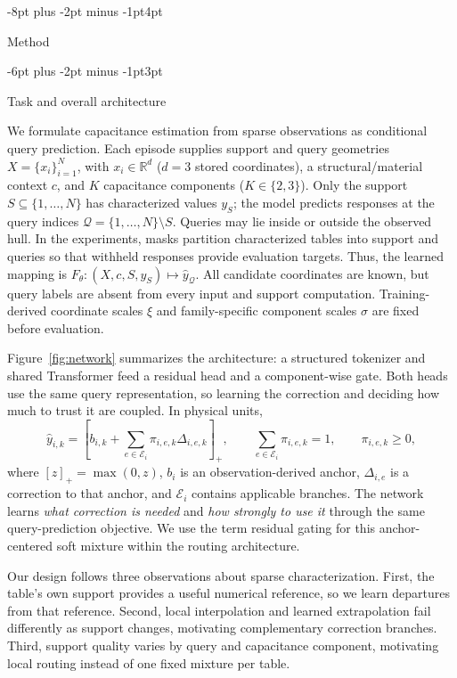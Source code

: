 \documentclass{article}
\makeatletter
\renewcommand{\section}{\@startsection{section}{1}{\z@}
  {-8pt plus -2pt minus -1pt}{4pt}{\large\sc\raggedright}}
\renewcommand{\subsection}{\@startsection{subsection}{2}{\z@}
  {-6pt plus -2pt minus -1pt}{3pt}{\normalsize\sc\raggedright}}
\makeatother
\begin{document}
\section{Method}
\label{sec:method}

\subsection{Task and overall architecture}

We formulate capacitance estimation from sparse observations as conditional
query prediction. Each episode supplies support and query geometries $X=\{x_i\}_{i=1}^{N}$, with
$x_i\in\mathbb{R}^{d}$ ($d=3$ stored coordinates), a structural/material
context $c$, and $K$ capacitance components ($K\in\{2,3\}$).
Only the support $S\subseteq\{1,\ldots,N\}$ has characterized values $y_S$;
the model predicts responses at the query indices
$\mathcal{Q}=\{1,\ldots,N\}\setminus S$. Queries may lie inside or outside
the observed hull. In the experiments, masks partition characterized tables
into support and queries so that withheld responses provide evaluation targets.
Thus, the learned mapping is
$F_\theta:(X,c,S,y_S)\mapsto\hat y_{\mathcal{Q}}$.
All candidate coordinates are known, but query labels are absent from every
input and support computation. Training-derived coordinate scales $\xi$ and
family-specific component scales $\sigma$ are fixed before evaluation.

Figure~\ref{fig:network} summarizes the architecture: a structured tokenizer and
shared Transformer feed a residual head and a component-wise gate. Both heads
use the same query representation, so learning the correction and deciding how
much to trust it are coupled. In physical units,
\begin{equation}
\label{eq:main}
\hat y_{i,k}=\left[b_{i,k}+
 \sum_{e\in\mathcal{E}_i}\pi_{i,e,k}\Delta_{i,e,k}\right]_+,
\qquad \sum_{e\in\mathcal{E}_i}\pi_{i,e,k}=1,
\qquad \pi_{i,e,k}\geq0,
\end{equation}
where $[z]_+=\max(0,z)$, $b_i$ is an observation-derived anchor,
$\Delta_{i,e}$ is a correction to that anchor, and $\mathcal{E}_i$ contains
applicable branches. The network learns \emph{what correction is needed} and
\emph{how strongly to use it} through the same query-prediction objective. We use the term residual gating
for this anchor-centered soft mixture within the routing architecture.

Our design follows three observations about sparse characterization.
First, the table's own support provides a useful numerical reference, so we
learn departures from that reference. Second, local interpolation and learned
extrapolation fail differently as support changes, motivating complementary
correction branches. Third, support quality varies by query and capacitance
component, motivating local routing instead of one fixed mixture per table.
\end{document}
